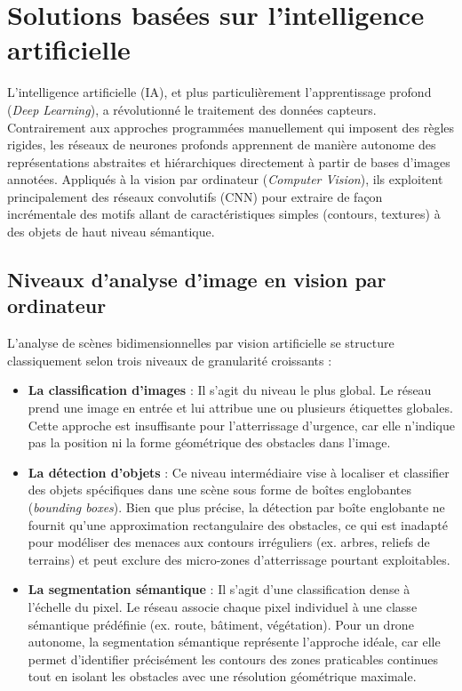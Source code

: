 \section{Solutions basées sur l'intelligence artificielle}
\label{sec:ia-segmentation}

L'intelligence artificielle (IA), et plus particulièrement l'apprentissage profond (\textit{Deep Learning}), a révolutionné le traitement des données capteurs. Contrairement aux approches programmées manuellement qui imposent des règles rigides, les réseaux de neurones profonds apprennent de manière autonome des représentations abstraites et hiérarchiques directement à partir de bases d'images annotées. Appliqués à la vision par ordinateur (\textit{Computer Vision}), ils exploitent principalement des réseaux convolutifs (CNN) pour extraire de façon incrémentale des motifs allant de caractéristiques simples (contours, textures) à des objets de haut niveau sémantique.

\subsection{Niveaux d'analyse d'image en vision par ordinateur}

L'analyse de scènes bidimensionnelles par vision artificielle se structure classiquement selon trois niveaux de granularité croissants :
\begin{itemize}[leftmargin=1.8em, itemsep=4pt]
  \item \textbf{La classification d'images} : Il s'agit du niveau le plus global. Le réseau prend une image en entrée et lui attribue une ou plusieurs étiquettes globales. Cette approche est insuffisante pour l'atterrissage d'urgence, car elle n'indique pas la position ni la forme géométrique des obstacles dans l'image.
  \item \textbf{La détection d'objets} : Ce niveau intermédiaire vise à localiser et classifier des objets spécifiques dans une scène sous forme de boîtes englobantes (\textit{bounding boxes}). Bien que plus précise, la détection par boîte englobante ne fournit qu'une approximation rectangulaire des obstacles, ce qui est inadapté pour modéliser des menaces aux contours irréguliers (ex. arbres, reliefs de terrains) et peut exclure des micro-zones d'atterrissage pourtant exploitables.
  \item \textbf{La segmentation sémantique} : Il s'agit d'une classification dense à l'échelle du pixel. Le réseau associe chaque pixel individuel à une classe sémantique prédéfinie (ex. route, bâtiment, végétation). Pour un drone autonome, la segmentation sémantique représente l'approche idéale, car elle permet d'identifier précisément les contours des zones praticables continues tout en isolant les obstacles avec une résolution géométrique maximale.
\end{itemize}

